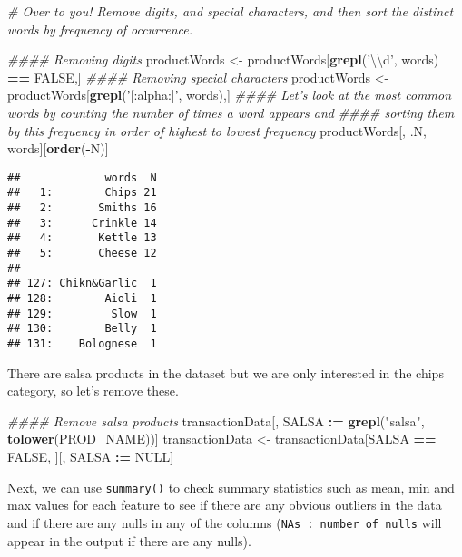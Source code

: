 \documentclass[]{article}
\newenvironment{Shaded}{\begin{snugshade}}{\end{snugshade}}
\newcommand{\CharTok}[1]{\textcolor[rgb]{0.31,0.60,0.02}{#1}}
\newcommand{\CommentTok}[1]{\textcolor[rgb]{0.56,0.35,0.01}{\textit{#1}}}
\newcommand{\ErrorTok}[1]{\textcolor[rgb]{0.64,0.00,0.00}{\textbf{#1}}}
\newcommand{\KeywordTok}[1]{\textcolor[rgb]{0.13,0.29,0.53}{\textbf{#1}}}
\newcommand{\NormalTok}[1]{#1}
\newcommand{\OperatorTok}[1]{\textcolor[rgb]{0.81,0.36,0.00}{\textbf{#1}}}
\newcommand{\OtherTok}[1]{\textcolor[rgb]{0.56,0.35,0.01}{#1}}
\newcommand{\StringTok}[1]{\textcolor[rgb]{0.31,0.60,0.02}{#1}}
\begin{document}
\begin{Shaded}
\begin{Highlighting}[]
\CommentTok{# Over to you! Remove digits, and special characters, and then sort the distinct words by frequency of occurrence.}

\CommentTok{#### Removing digits}
\NormalTok{productWords <-}\StringTok{ }\NormalTok{productWords[}\KeywordTok{grepl}\NormalTok{(}\StringTok{'}\CharTok{\textbackslash{}\textbackslash{}}\StringTok{d'}\NormalTok{, words) }\OperatorTok{==}\StringTok{ }\OtherTok{FALSE}\NormalTok{,]}
\CommentTok{#### Removing special characters}
\NormalTok{productWords <-}\StringTok{ }\NormalTok{productWords[}\KeywordTok{grepl}\NormalTok{(}\StringTok{'[:alpha:]'}\NormalTok{, words),]}
\CommentTok{#### Let's look at the most common words by counting the number of times a word appears and}
\CommentTok{#### sorting them by this frequency in order of highest to lowest frequency}
\NormalTok{productWords[, .N, words][}\KeywordTok{order}\NormalTok{(}\OperatorTok{-}\NormalTok{N)]}
\end{Highlighting}
\end{Shaded}

\begin{verbatim}
##             words  N
##   1:        Chips 21
##   2:       Smiths 16
##   3:      Crinkle 14
##   4:       Kettle 13
##   5:       Cheese 12
##  ---                
## 127: Chikn&Garlic  1
## 128:        Aioli  1
## 129:         Slow  1
## 130:        Belly  1
## 131:    Bolognese  1
\end{verbatim}

There are salsa products in the dataset but we are only interested in
the chips category, so let's remove these.

\begin{Shaded}
\begin{Highlighting}[]
\CommentTok{#### Remove salsa products}
\NormalTok{transactionData[, SALSA }\OperatorTok{:}\ErrorTok{=}\StringTok{ }\KeywordTok{grepl}\NormalTok{(}\StringTok{"salsa"}\NormalTok{, }\KeywordTok{tolower}\NormalTok{(PROD_NAME))]}
\NormalTok{transactionData <-}\StringTok{ }\NormalTok{transactionData[SALSA }\OperatorTok{==}\StringTok{ }\OtherTok{FALSE}\NormalTok{, ][, SALSA }\OperatorTok{:}\ErrorTok{=}\StringTok{ }\OtherTok{NULL}\NormalTok{]}
\end{Highlighting}
\end{Shaded}

Next, we can use \texttt{summary()} to check summary statistics such as
mean, min and max values for each feature to see if there are any
obvious outliers in the data and if there are any nulls in any of the
columns (\texttt{NA\textquotesingle{}s\ :\ number\ of\ nulls} will
appear in the output if there are any nulls).
\end{document}
